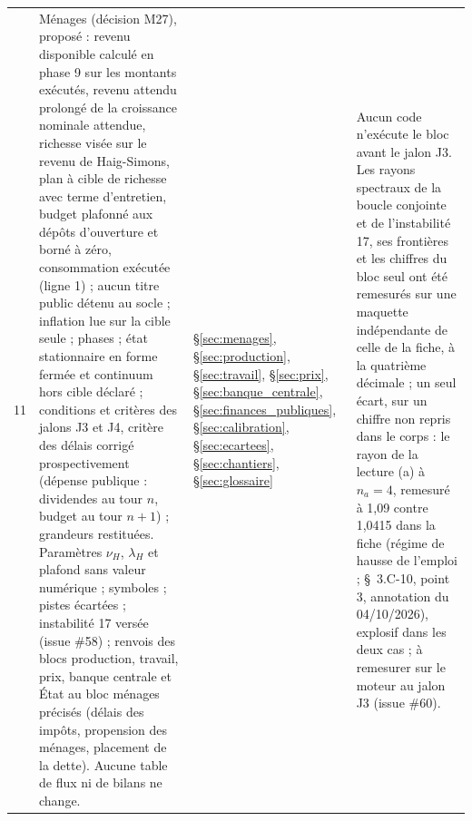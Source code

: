 \documentclass[11pt,a4paper]{article}
\begin{document}
\begin{center}
\begin{longtable}{p{0.5cm}>{\raggedright\arraybackslash}p{6.3cm}>{\raggedright\arraybackslash}p{2.1cm}>{\raggedright\arraybackslash}p{5.8cm}}
11 & Ménages (décision M27), proposé : revenu disponible calculé en phase 9 sur les montants exécutés, revenu attendu prolongé de la croissance nominale attendue, richesse visée sur le revenu de Haig-Simons, plan à cible de richesse avec terme d'entretien, budget plafonné aux dépôts d'ouverture et borné à zéro, consommation exécutée (ligne 1) ; aucun titre public détenu au socle ; inflation lue sur la cible seule ; phases ; état stationnaire en forme fermée et continuum hors cible déclaré ; conditions et critères des jalons J3 et J4, critère des délais corrigé prospectivement (dépense publique : dividendes au tour $n$, budget au tour $n + 1$) ; grandeurs restituées. Paramètres $\nu_H$, $\lambda_H$ et plafond sans valeur numérique ; symboles ; pistes écartées ; instabilité 17 versée (issue \#58) ; renvois des blocs production, travail, prix, banque centrale et État au bloc ménages précisés (délais des impôts, propension des ménages, placement de la dette). Aucune table de flux ni de bilans ne change. & \S\ref{sec:menages}, \S\ref{sec:production}, \S\ref{sec:travail}, \S\ref{sec:prix}, \S\ref{sec:banque_centrale}, \S\ref{sec:finances_publiques}, \S\ref{sec:calibration}, \S\ref{sec:ecartees}, \S\ref{sec:chantiers}, \S\ref{sec:glossaire} & Aucun code n'exécute le bloc avant le jalon J3. Les rayons spectraux de la boucle conjointe et de l'instabilité 17, ses frontières et les chiffres du bloc seul ont été remesurés sur une maquette indépendante de celle de la fiche, à la quatrième décimale ; un seul écart, sur un chiffre non repris dans le corps : le rayon de la lecture (a) à $n_a = 4$, remesuré à 1,09 contre 1,0415 dans la fiche (régime de hausse de l'emploi ; \S~3.C-10, point 3, annotation du 04/10/2026), explosif dans les deux cas ; à remesurer sur le moteur au jalon J3 (issue \#60).\\

\end{longtable}
\end{center}
\end{document}
